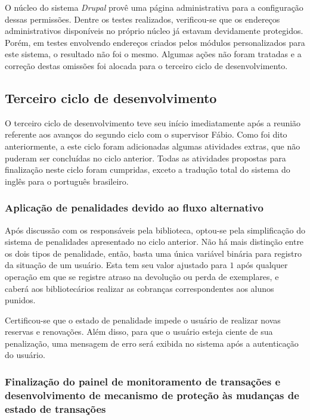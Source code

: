 \documentclass[a4paper]{article}
\begin{document}
O núcleo do sistema \textit{Drupal} provê uma página administrativa para a configuração dessas permissões. Dentre os testes realizados, verificou-se que os endereços administrativos disponíveis no próprio núcleo já estavam devidamente protegidos. Porém, em testes envolvendo endereços criados pelos módulos personalizados para este sistema, o resultado não foi o mesmo. Algumas ações não foram tratadas e a correção destas omissões foi alocada para o terceiro ciclo de desenvolvimento.

\subsection{Terceiro ciclo de desenvolvimento}

O terceiro ciclo de desenvolvimento teve seu início imediatamente após a reunião referente aos avanços do segundo ciclo com o supervisor Fábio. Como foi dito anteriormente, a este ciclo foram adicionadas algumas atividades extras, que não puderam ser concluídas no ciclo anterior. Todas as atividades propostas para finalização neste ciclo foram cumpridas, exceto a tradução total do sistema do inglês para o português brasileiro.

\subsubsection{Aplicação de penalidades devido ao fluxo alternativo}
    
Após discussão com os responsáveis pela biblioteca, optou-se pela simplificação do sistema de penalidades apresentado no ciclo anterior. Não há mais distinção entre os dois tipos de penalidade, então, basta uma única variável binária para registro da situação de um usuário. Esta tem seu valor ajustado para $1$ após qualquer operação em que se registre atraso na devolução ou perda de exemplares, e caberá aos bibliotecários realizar as cobranças correspondentes aos alunos punidos.
    
Certificou-se que o estado de penalidade impede o usuário de realizar novas reservas e renovações. Além disso, para que o usuário esteja ciente de sua penalização, uma mensagem de erro será exibida no sistema após a autenticação do usuário. 

\subsubsection{Finalização do painel de monitoramento de transações e desenvolvimento de mecanismo de proteção às mudanças de estado de transações}
    
\end{document}
